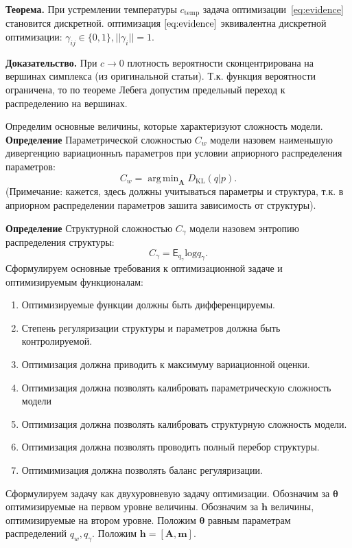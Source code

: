 \documentclass[12pt]{article}
\DeclareMathOperator*{\argmin}{arg\,min}
\begin{document}
\textbf{Теорема.} При устремлении температуры $c_{\text{temp}}$ задача оптимизации~\eqref{eq:evidence} становится дискретной. оптимизация  $\eqref{eq:evidence}$ эквивалентна дискретной оптимизации: $\gamma_{ij} \in \{0, 1\}, ||\gamma_i|| = 1$. 

\textbf{Доказательство.} При $c \to 0$ плотность вероятности сконцентрирована на вершинах симплекса (из оригинальной статьи). Т.к. функция вероятности ограничена, то по теореме Лебега допустим предельный переход к распределению на вершинах.  



Определим основные величины, которые характеризуют сложность модели. \\
\textbf{Определение} Параметрической сложностью $C_w$ модели назовем наименьшую дивергенцию вариационныъ параметров  при условии априорного распределения параметров:
\[
    C_w = \argmin_\mathbf{A} D_\text{KL}\left(q|p\right).
\]
(Примечание: кажется, здесь должны учитываться параметры и структура, т.к. в априорном распределении параметров зашита зависимость от структуры).

\textbf{Определение} Структурной сложностью $C_\gamma$ модели назовем энтропию распределения структуры:
\[
    C_\gamma = \mathsf{E}_{q_\gamma} \text{log}q_\gamma.
\]
Сформулируем основные требования к оптимизационной задаче и оптимизируемым функционалам:
\begin{enumerate}
\item Оптимизируемые функции должны быть дифференцируемы.
\item Степень регуляризации структуры и параметров должна быть контролируемой.
\item Оптимизация должна приводить к максимуму вариационной оценки.
\item Оптимизация должна позволять калибровать параметрическую сложность модели
\item Оптимизация должна позволять калибровать структурную сложность модели.
\item Оптимизация должна позволять проводить полный перебор структуры.
\item Оптимимизация должна позволять баланс регуляризации.
\end{enumerate}

Сформулируем задачу как двухуровневую задачу оптимизации. Обозначим за  $\boldsymbol{\theta}$ оптимизируемые на первом уровне величины. Обозначим за $\mathbf{h}$ величины, оптимизируемые на втором уровне.
Положим $\boldsymbol{\theta}$ равным параметрам распределений $q_w, q_\gamma$. 
Положим $\mathbf{h} = [\mathbf{A}, \mathbf{m}].$
\end{document}
